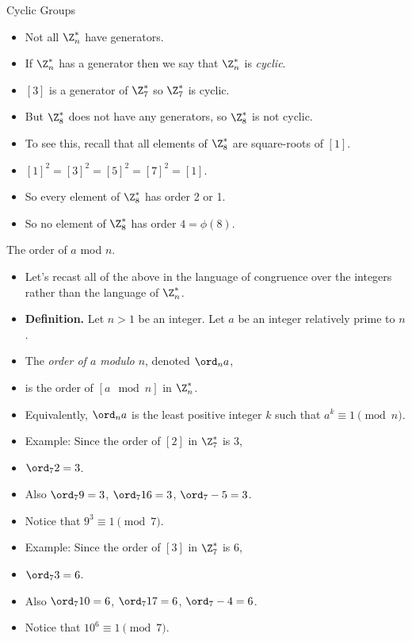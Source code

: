 \documentclass{beamer}
\begin{document}
\begin{frame}{Cyclic Groups}

\begin{itemize}
  \item Not all $\Z_n^*$ have generators.
  \item If $\Z_n^*$ has a generator then we say that $\Z_n^*$ is \emph{cyclic}.
  \item $[3]$ is a generator of $\Z_7^*$ so $\Z_7^*$ is cyclic.
  \item But $\Z_8^*$ does not have any generators, so $\Z_8^*$ is not cyclic.
  \item To see this, recall that all elements of $\Z_8^*$ are square-roots of $[1]$.
  \item $[1]^2 = [3]^2 = [5]^2 = [7]^2 = [1]$.
  \item So every element of $\Z_8^*$ has order 2 or 1.
  \item So no element of $\Z_8^*$ has order $4 = \phi(8)$.
\end{itemize}

\end{frame}

\begin{frame}{The order of $a$ mod $n$.}

\begin{itemize}
  \item Let's recast all of the above in the language of congruence over the integers rather than the language of $\Z_n^*$.
  \item \textbf{Definition.} Let $n>1$ be an integer. Let $a$ be an integer relatively prime to $n$.
  \item The \emph{order of $a$ modulo $n$}, denoted $\ord_n a$,
  \item is the order of $[a \mod n]$ in $\Z_n^*$.
  \item Equivalently, $\ord_n a$ is the least positive integer $k$ such that $a^k \equiv 1 \pmod n$.
  \item Example: Since the order of $[2]$ in $\Z_7^*$ is 3,
  \item $\ord_7 2 = 3$.
  \item Also $\ord_7 9 = 3$, $\ord_7 16 = 3$, $\ord_7 -5 = 3$.
  \item Notice that $9^3 \equiv 1 \pmod 7$.
   \item Example: Since the order of $[3]$ in $\Z_7^*$ is 6,
  \item $\ord_7 3 = 6$.
  \item Also $\ord_7 10 = 6$, $\ord_7 17 = 6$, $\ord_7 -4 = 6$.
  \item Notice that $10^6 \equiv 1 \pmod 7$.
\end{itemize}

\end{frame}
\end{document}
